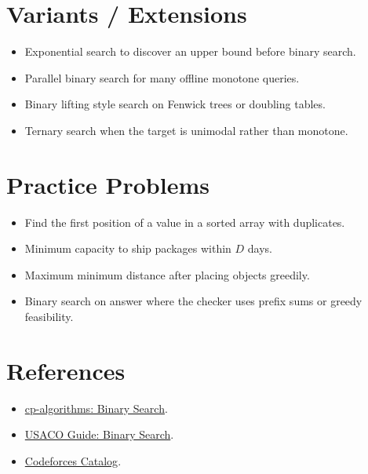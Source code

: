 \section*{Variants / Extensions}

\begin{itemize}
  \item Exponential search to discover an upper bound before binary search.
  \item Parallel binary search for many offline monotone queries.
  \item Binary lifting style search on Fenwick trees or doubling tables.
  \item Ternary search when the target is unimodal rather than monotone.
\end{itemize}

\section*{Practice Problems}

\begin{itemize}
  \item Find the first position of a value in a sorted array with duplicates.
  \item Minimum capacity to ship packages within \(D\) days.
  \item Maximum minimum distance after placing objects greedily.
  \item Binary search on answer where the checker uses prefix sums or greedy feasibility.
\end{itemize}

\section*{References}

\begin{itemize}
  \item \href{https://cp-algorithms.com/num_methods/binary_search.html}{cp-algorithms: Binary Search}.
  \item \href{https://usaco.guide/silver/binary-search}{USACO Guide: Binary Search}.
  \item \href{https://codeforces.com/catalog}{Codeforces Catalog}.
\end{itemize}
